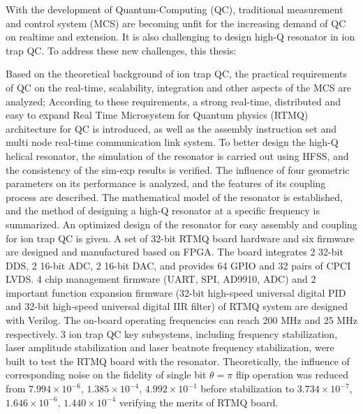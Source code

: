 \begin{abstract*}
  With the development of Quantum-Computing (QC), traditional measurement and control system (MCS) are becoming unfit for the increasing demand of QC on realtime and extension. It is also challenging to design high-Q resonator in ion trap QC. To address these new challenges, this thesis: 

  Based on the theoretical background of ion trap QC, the practical requirements of QC on the real-time, scalability, integration and other aspects of the MCS are analyzed; According to these requirements, a strong real-time, distributed and easy to expand Real Time Microsystem for Quantum physics (RTMQ) architecture for QC is introduced, as well as the assembly instruction set and multi node real-time communication link system.
  To better design the high-Q helical resonator, the simulation of the resonator is carried out using HFSS, and the consistency of the sim-exp results is verified. The influence of four geometric parameters on its performance is analyzed, and the features of its coupling process are described. The mathematical model of the resonator is established, and the method of designing a high-Q resonator at a specific frequency is summarized. An optimized design of the resonator for easy assembly and coupling for ion trap QC is given.
  A set of 32-bit RTMQ board hardware and six firmware are designed and manufactured based on FPGA. The board integrates 2 32-bit DDS, 2 16-bit ADC, 2 16-bit DAC, and provides 64 GPIO and 32 pairs of CPCI LVDS. 4 chip management firmware (UART, SPI, AD9910, ADC) and 2 important function expansion firmware (32-bit high-speed universal digital PID and 32-bit high-speed universal digital IIR filter) of RTMQ system are designed with Verilog. The on-board operating frequencies can reach 200 MHz and 25 MHz respectively.
  3 ion trap QC key subsystems, including frequency stabilization, laser amplitude stabilization and laser beatnote frequency stabilization, were built to test the RTMQ board with the resonator. Theoretically, the influence of corresponding noise on the fidelity of single bit $\theta=\pi$ flip operation was reduced from $7.994\times10 ^ {-6}$, $1.385\times 10 ^ {-4}$, $4.992\times 10 ^ {-1}$ before stabilization to $3.734\times10 ^ {-7}$, $1.646\times 10 ^ {-6}$, $1.440\times 10^ {-4}$ verifying the merits of RTMQ board.
  

\end{abstract*}
